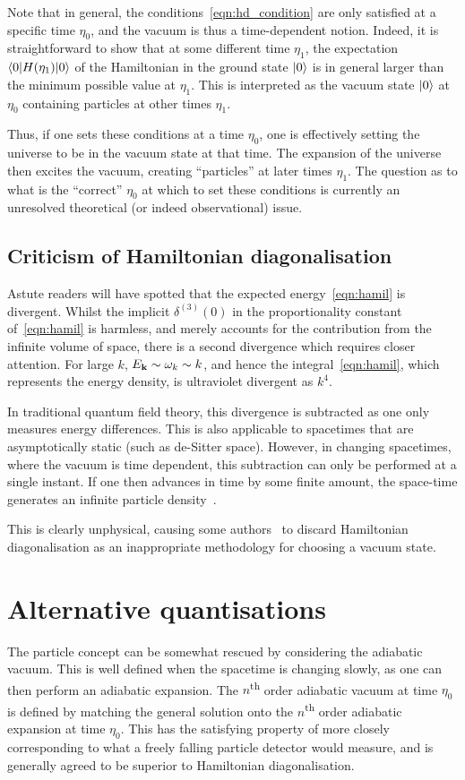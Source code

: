 Note that in general, the conditions~\eqref{eqn:hd_condition} are only satisfied at a specific time $\eta_0$, and the vacuum is thus a time-dependent notion. 
Indeed, it is straightforward to show that at some different time $\eta_1$, the expectation $\left\langle0\middle|H(\eta_1)\middle|0\right\rangle$ of the Hamiltonian in the ground state $\left|0\right\rangle$ is in general larger than the minimum possible value at $\eta_1$. This is interpreted as the vacuum state $\left|0\right\rangle$ at $\eta_0$ containing particles at other times $\eta_1$.

Thus, if one sets these conditions at a time $\eta_0$, one is effectively setting the universe to be in the vacuum state at that time. The expansion of the universe then excites the vacuum, creating ``particles'' at later times $\eta_1$. The question as to what is the ``correct'' $\eta_0$ at which to set these conditions is currently an unresolved theoretical (or indeed observational) issue. 


\subsection{Criticism of Hamiltonian diagonalisation}

Astute readers will have spotted that the expected energy~\eqref{eqn:hamil} is divergent. Whilst the implicit $\delta^{(3)}(0)$ in the proportionality constant of~\eqref{eqn:hamil} is harmless, and merely accounts for the contribution from the infinite volume of space, there is a second divergence which requires closer attention. For large $k$, $E_{\mathbf{k}}\sim \omega_k \sim k$, and hence the integral~\eqref{eqn:hamil}, which represents the energy density, is ultraviolet divergent as $k^4$. 

In traditional quantum field theory, this divergence is subtracted as one only measures energy differences. This is also applicable to spacetimes that are asymptotically static (such as de-Sitter space).
However, in changing spacetimes, where the vacuum is time dependent, this subtraction can only be performed at a single instant. If one then advances in time by some finite amount, the space-time generates an infinite particle density~\cite{Fulling_HD,Fulling+1989}. 

This is clearly unphysical, causing some authors~\cite{Fulling_HD} to discard Hamiltonian diagonalisation as an inappropriate methodology for choosing a vacuum state.

\section{Alternative quantisations}
The particle concept can be somewhat rescued by considering the adiabatic vacuum. This is well defined when the spacetime is changing slowly, as one can then perform an adiabatic expansion. The $n$\textsuperscript{th} order adiabatic vacuum at time $\eta_0$ is defined by matching the general solution onto the $n$\textsuperscript{th} order adiabatic expansion at time $\eta_0$. This has the satisfying property of more closely corresponding to what a freely falling particle detector would measure, and is generally agreed to be superior to Hamiltonian diagonalisation.

